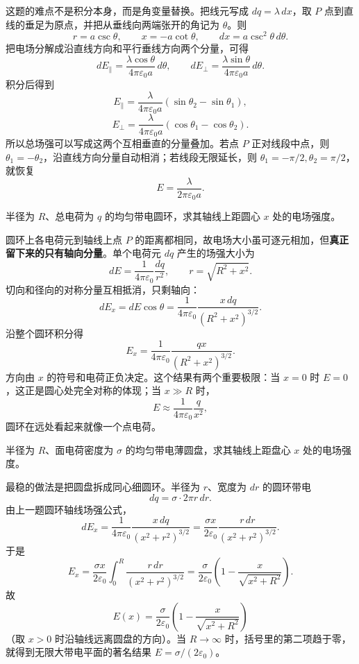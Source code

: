 \documentclass[lang=cn,11pt]{elegantbook}
\begin{document}
\begin{solution}
这题的难点不是积分本身，而是角变量替换。把线元写成 \(dq=\lambda\,dx\)，取 \(P\) 点到直线的垂足为原点，并把从垂线向两端张开的角记为 \(\theta\)。则
\[
r=a\csc\theta,\qquad x=-a\cot\theta,\qquad dx=a\csc^2\theta\,d\theta.
\]
把电场分解成沿直线方向和平行垂线方向两个分量，可得
\[
dE_\parallel=\frac{\lambda\cos\theta}{4\pi\varepsilon_0 a}\,d\theta,
\qquad
dE_\perp=\frac{\lambda\sin\theta}{4\pi\varepsilon_0 a}\,d\theta.
\]
积分后得到
\[
E_\parallel
=\frac{\lambda}{4\pi\varepsilon_0 a}
\left(\sin\theta_2-\sin\theta_1\right),
\]
\[
E_\perp
=\frac{\lambda}{4\pi\varepsilon_0 a}
\left(\cos\theta_1-\cos\theta_2\right).
\]
所以总场强可以写成这两个互相垂直的分量叠加。若点 \(P\) 正对线段中点，则 \(\theta_1=-\theta_2\)，沿直线方向分量自动相消；若线段无限延长，则 \(\theta_1=-\pi/2,\theta_2=\pi/2\)，就恢复
\[
E=\frac{\lambda}{2\pi\varepsilon_0 a}.
\]
\end{solution}

\begin{example}[均匀带电圆环轴线上的场强]
半径为 \(R\)、总电荷为 \(q\) 的均匀带电圆环，求其轴线上距圆心 \(x\) 处的电场强度。
\end{example}

\begin{solution}
圆环上各电荷元到轴线上点 \(P\) 的距离都相同，故电场大小虽可逐元相加，但\textbf{真正留下来的只有轴向分量}。单个电荷元 \(dq\) 产生的场强大小为
\[
dE=\frac{1}{4\pi\varepsilon_0}\frac{dq}{r^2},
\qquad
r=\sqrt{R^2+x^2}.
\]
切向和径向的对称分量互相抵消，只剩轴向：
\[
dE_x=dE\cos\theta
=\frac{1}{4\pi\varepsilon_0}\frac{x\,dq}{(R^2+x^2)^{3/2}}.
\]
沿整个圆环积分得
\[
\boxed{
E_x=\frac{1}{4\pi\varepsilon_0}
\frac{qx}{(R^2+x^2)^{3/2}}
}.
\]
方向由 \(x\) 的符号和电荷正负决定。这个结果有两个重要极限：当 \(x=0\) 时 \(E=0\)，这正是圆心处完全对称的体现；当 \(x\gg R\) 时，
\[
E\approx \frac{1}{4\pi\varepsilon_0}\frac{q}{x^2},
\]
圆环在远处看起来就像一个点电荷。
\end{solution}

\begin{example}[均匀带电圆盘轴线上的场强]
半径为 \(R\)、面电荷密度为 \(\sigma\) 的均匀带电薄圆盘，求其轴线上距盘心 \(x\) 处的电场强度。
\end{example}

\begin{solution}
最稳的做法是把圆盘拆成同心细圆环。半径为 \(r\)、宽度为 \(dr\) 的圆环带电
\[
dq=\sigma\cdot 2\pi r\,dr.
\]
由上一题圆环轴线场强公式，
\[
dE_x=\frac{1}{4\pi\varepsilon_0}
\frac{x\,dq}{(x^2+r^2)^{3/2}}
=\frac{\sigma x}{2\varepsilon_0}
\frac{r\,dr}{(x^2+r^2)^{3/2}}.
\]
于是
\[
E_x=\frac{\sigma x}{2\varepsilon_0}
\int_0^R\frac{r\,dr}{(x^2+r^2)^{3/2}}
=\frac{\sigma}{2\varepsilon_0}\left(1-\frac{x}{\sqrt{x^2+R^2}}\right).
\]
故
\[
\boxed{
E(x)=\frac{\sigma}{2\varepsilon_0}\left(1-\frac{x}{\sqrt{x^2+R^2}}\right)
}
\]
（取 \(x>0\) 时沿轴线远离圆盘的方向）。当 \(R\to\infty\) 时，括号里的第二项趋于零，就得到无限大带电平面的著名结果 \(E=\sigma/(2\varepsilon_0)\)。
\end{solution}
\end{document}
